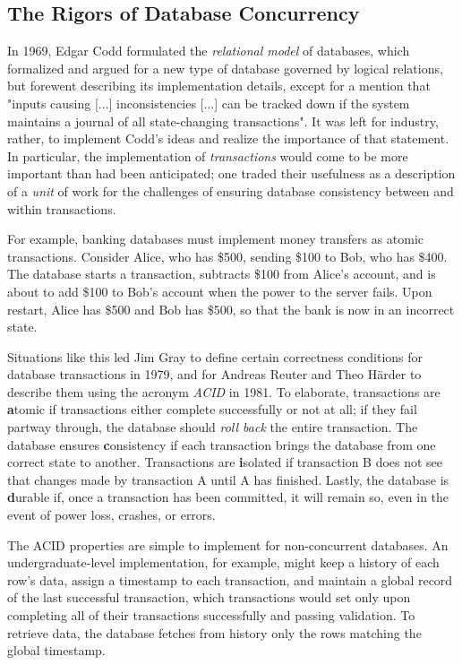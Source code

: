 \documentclass[12pt]{article} %
\begin{document}

\subsection{The Rigors of Database Concurrency} %

In 1969, Edgar Codd formulated the \textit{relational model} of databases, which formalized and argued for a new type of database governed by logical relations, but forewent describing its implementation details, except for a mention that "inputs causing [...] inconsistencies [...] can be tracked down if the system maintains a journal of all state-changing transactions". It was left for industry, rather, to implement Codd's ideas and realize the importance of that statement. In particular, the implementation of \textit{transactions} would come to be more important than had been anticipated; one traded their usefulness as a description of a \textit{unit} of work for the challenges of ensuring database consistency between and within transactions. 

For example, banking databases must implement money transfers as atomic transactions. Consider Alice, who has \$500, sending \$100 to Bob, who has \$400. The database starts a transaction, subtracts \$100 from Alice's account, and is about to add \$100 to Bob's account when the power to the server fails.  Upon restart, Alice has \$500 and Bob has \$500, so that the bank is now in an incorrect state. 

Situations like this led Jim Gray to define certain correctness conditions for database transactions in 1979, and for Andreas Reuter and Theo H{\"a}rder to describe them using the acronym \textit{ACID} in 1981. To elaborate, transactions are \textbf{a}tomic if transactions either complete successfully or not at all; if they fail partway through, the database should \textit{roll back} the entire transaction. The database ensures \textbf{c}onsistency if each transaction brings the database from one correct state to another. Transactions are \textbf{i}solated if transaction B does not see that changes made by transaction A until A has finished. Lastly, the database is \textbf{d}urable if, once a transaction has been committed, it will remain so, even in the event of power loss, crashes, or errors.

The ACID properties are simple to implement for non-concurrent databases. An undergraduate-level implementation, for example, might keep a history of each row's data, assign a timestamp to each transaction, and maintain a global record of the last successful transaction, which transactions would set only upon completing all of their transactions successfully and passing validation. To retrieve data, the database fetches from history only the rows matching the global timestamp.
\end{document}
